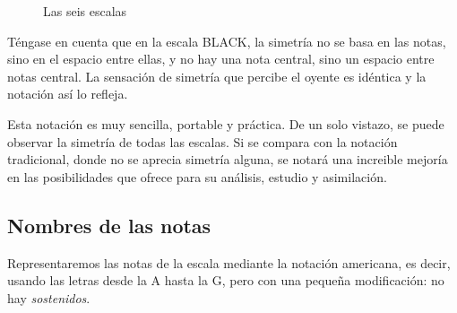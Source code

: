 \documentclass[]{article}
\begin{document}
\begin{figure}
\begin{subfigure}{0.15\textwidth}
\begin{tikzpicture}
    \end{tikzpicture}    
    \caption{}
    \label{fig:tikz2}
  \end{subfigure}
  \hfill
  \begin{subfigure}{0.15\textwidth}
    \centering
    \caption{}
    \label{fig:tikz2}
  \end{subfigure}
  \hfill
  \caption{Las seis escalas}
  \label{fig:the-six-scales}
\end{figure}


Téngase en cuenta que en la escala BLACK, la simetría no se basa en las notas, sino en el espacio entre ellas, y no hay una nota central, sino un espacio entre notas central. La sensación de simetría que percibe el oyente es idéntica y la notación así lo refleja.

Esta notación es muy sencilla, portable y práctica. De un solo vistazo, se puede observar la simetría de todas las escalas. Si se compara con la notación tradicional, donde no se aprecia simetría alguna, se notará una increible mejoría en las posibilidades que ofrece para su análisis, estudio y asimilación.


\subsection{Nombres de las notas}

Representaremos las notas de la escala mediante la notación americana, es decir, usando las letras desde la A hasta la G, pero con una pequeña modificación: no hay \emph{sostenidos}.
\end{document}

